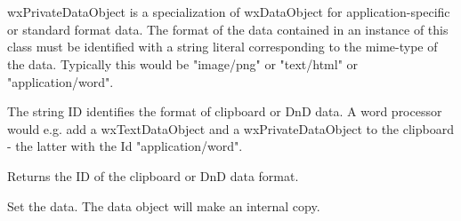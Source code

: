 \section{}\label{wxprivatedataobject}

wxPrivateDataObject is a specialization of wxDataObject for application-specific or standard
format data. The format of the data contained in an instance of this class must be identified
with a string literal corresponding to the mime-type of the data. Typically this would be
"image/png" or "text/html" or "application/word".






\label{wxprivatedataobjectwxprivatedataobject}


\label{wxprivatedataobjectdtor}


\label{wxprivatedataobjectsetid}


The string ID identifies the format of clipboard or DnD data. A word
processor would e.g. add a wxTextDataObject and a wxPrivateDataObject
to the clipboard - the latter with the Id "application/word".

\label{wxprivatedataobjectgetid}


Returns the ID of the clipboard or DnD data format.

\label{wxprivatedataobjectsetdata}


Set the data. The data object will make an internal copy.

\label{wxprivatedataobjectgetsize}

